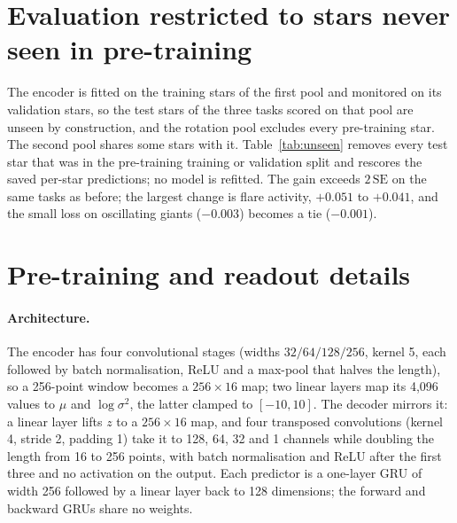 \documentclass{article}
\begin{document}
\section{Evaluation restricted to stars never seen in pre-training}
\label{app:unseen}

The encoder is fitted on the training stars of the first pool and monitored on its validation stars,
so the test stars of
the three tasks scored on that pool are unseen by construction, and the rotation pool excludes every
pre-training star. The second pool shares some stars with
it. Table~\ref{tab:unseen} removes every test star that was in the pre-training training or validation
split and rescores the saved per-star predictions; no model is refitted. The gain exceeds
$2\,\mathrm{SE}$ on the same tasks as before; the largest change is flare activity, $+0.051$ to
$+0.041$, and the small loss on oscillating giants ($-0.003$) becomes a tie ($-0.001$).

\begin{table}[H]
\caption{The fusion gain (features\,$\oplus\,\mu$ minus features, linear readout) on all test stars and
on the test stars never seen in pre-training. Bold: beyond $2\,\mathrm{SE}$ over six encoder seeds.}
\label{tab:unseen}
\centering
\scriptsize

\end{table}

\section{Pre-training and readout details}
\label{app:training}

\paragraph{Architecture.} The encoder has four convolutional stages (widths $32/64/128/256$, kernel 5,
each followed by batch normalisation, ReLU and a max-pool that halves the length), so a 256-point
window becomes a $256 \times 16$ map; two linear layers map its 4{,}096 values to $\mu$ and
$\log\sigma^{2}$, the latter clamped to $[-10, 10]$. The decoder mirrors it: a linear layer lifts $z$
to a $256 \times 16$ map, and four transposed convolutions (kernel 4, stride 2, padding 1) take it to
128, 64, 32 and 1 channels while doubling the length from 16 to 256 points, with batch normalisation
and ReLU after the first three and no activation on the output. Each predictor is a one-layer GRU of
width 256 followed by a linear layer back to 128 dimensions; the forward and backward GRUs share no
weights.
\end{document}
